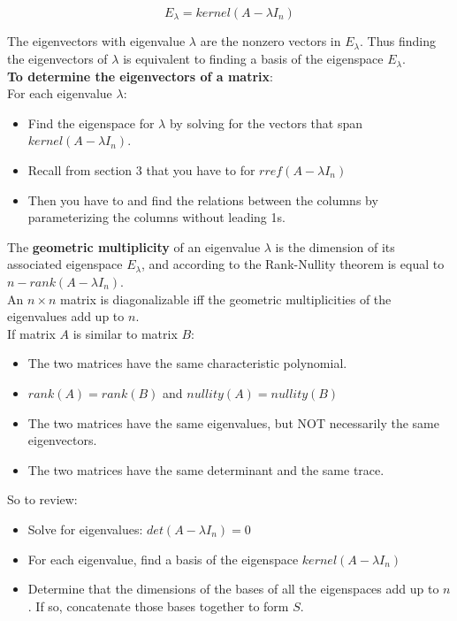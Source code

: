 \documentclass[]{scrartcl}
\begin{document}
	$$
	E_\lambda = kernel(A - \lambda I_n)
	$$
	
	The eigenvectors with eigenvalue $\lambda$ are the nonzero vectors in $E_\lambda$. Thus finding the eigenvectors of $\lambda$ is equivalent to finding a basis of the eigenspace $E_\lambda$.\\
	
	\textbf{To determine the eigenvectors of a matrix}:\\
	For each eigenvalue $\lambda$:
	\begin{itemize}
		\item Find the eigenspace for $\lambda$ by solving for the vectors that span $kernel(A - \lambda I_n)$.
		\item Recall from section 3 that you have to for $rref(A-\lambda I_n)$
		\item Then you have to and find the relations between the columns by parameterizing the columns without leading 1s.
	\end{itemize}

	The \textbf{geometric multiplicity} of an eigenvalue $\lambda$ is the dimension of its associated eigenspace $E_\lambda$, and according to the Rank-Nullity theorem is equal to $n - rank(A - \lambda I_n)$.\\
	
	An $n \times n$ matrix is diagonalizable iff the geometric multiplicities of the eigenvalues add up to $n$.\\
	
	If matrix $A$ is similar to matrix $B$:
	\begin{itemize}
		\item The two matrices have the same characteristic polynomial.
		\item $rank(A) = rank(B)$ and $nullity(A) = nullity(B)$
		\item The two matrices have the same eigenvalues, but NOT necessarily the same eigenvectors.
		\item The two matrices have the same determinant and the same trace.
	\end{itemize}
	
	So to review:
	\begin{itemize}
		\item Solve for eigenvalues: $ det(A - \lambda I_n) = 0 $
		\item For each eigenvalue, find a basis of the eigenspace $kernel(A - \lambda I_n)$
		\item Determine that the dimensions of the bases of all the eigenspaces add up to $n$. If so, concatenate those bases together to form $S$.
	\end{itemize} 
	
\end{document}
